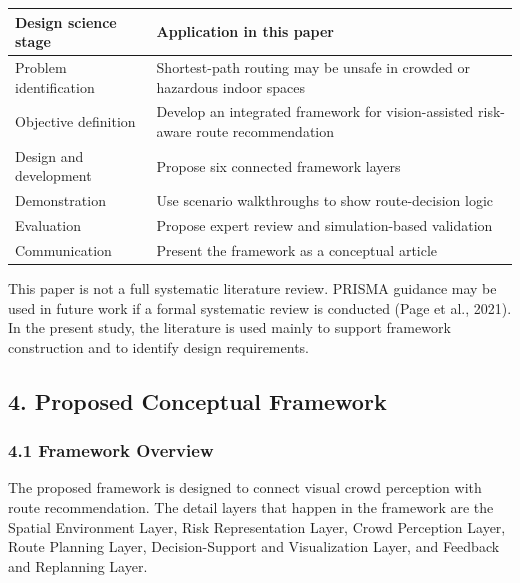 \documentclass[
]{article}
\newcounter{none} %
\begin{document}
{\def\LTcaptype{none} %
\begin{longtable}[]{@{}
  >{\raggedright\arraybackslash}p{}
  >{\raggedright\arraybackslash}p{}@{}}
\toprule\noalign{}
\begin{minipage}[b]{\linewidth}\raggedright
Design science stage
\end{minipage} & \begin{minipage}[b]{\linewidth}\raggedright
Application in this paper
\end{minipage} \\
\midrule\noalign{}
\endhead
\bottomrule\noalign{}
\endlastfoot
Problem identification & Shortest-path routing may be unsafe in crowded
or hazardous indoor spaces \\
Objective definition & Develop an integrated framework for
vision-assisted risk-aware route recommendation \\
Design and development & Propose six connected framework layers \\
Demonstration & Use scenario walkthroughs to show route-decision
logic \\
Evaluation & Propose expert review and simulation-based validation \\
Communication & Present the framework as a conceptual article \\
\end{longtable}
}

This paper is not a full systematic literature review. PRISMA guidance
may be used in future work if a formal systematic review is conducted
(Page et al., 2021). In the present study, the literature is used mainly
to support framework construction and to identify design requirements.

\subsection{4. Proposed Conceptual
Framework}\label{proposed-conceptual-framework}

\subsubsection{4.1 Framework Overview}\label{framework-overview}

The proposed framework is designed to connect visual crowd perception
with route recommendation. The detail layers that happen in the
framework are the Spatial Environment Layer, Risk Representation Layer,
Crowd Perception Layer, Route Planning Layer, Decision-Support and
Visualization Layer, and Feedback and Replanning Layer.
\end{document}
